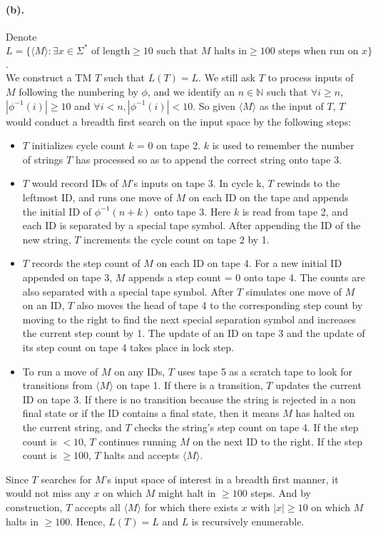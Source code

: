 \documentclass[12pt]{article}
\begin{document}
\paragraph*{(b).} Denote \(L = \{\langle M \rangle : \exists x \in \Sigma^* \text{ of length} \geq 10 \text{ such that } M \text{ halts in} \geq 100 \text{ steps when run on } x\}\).\\
We construct a TM \(T\) such that \(L(T) = L\). We still ask \(T\) to process inputs of \(M\) following the numbering by \(\phi\), and we identify an \(n \in \mathbb{N}\) such that \(\forall i \geq n\), \( |\phi^{-1}(i)| \geq 10\) and \(\forall i < n, |\phi^{-1}(i)| < 10\). So given \(\langle M \rangle\) as the input of \(T\), \(T\) would conduct a breadth first search on the input space by the following steps:
\begin{itemize}
  \item \(T\) initializes cycle count \(k\) = 0 on tape 2. \(k\) is used to remember the number of strings \(T\) has processed so as to append the correct string onto tape 3.
  \item \(T\) would record IDs of \(M\)'s inputs on tape 3. In cycle k, \(T\) rewinds to the leftmost ID, and runs one move of \(M\) on each ID on the tape and appends the initial ID of \(\phi^{-1}(n+k)\) onto tape 3. Here \(k\) is read from tape 2, and each ID is separated by a special tape symbol. After appending the ID of the new string, \(T\) increments the cycle count on tape 2 by 1.
  \item \(T\) records the step count of \(M\) on each ID on tape 4. For a new initial ID appended on tape 3, \(M\) appends a step count = 0 onto tape 4. The counts are also separated with a special tape symbol. After \(T\) simulates one move of \(M\) on an ID, \(T\) also moves the head of tape 4 to the corresponding step count by moving to the right to find the next special separation symbol and increases the current step count by 1. The update of an ID on tape 3 and the update of its step count on tape 4 takes place in lock step.
  \item To run a move of \(M\) on any IDs, \(T\) uses tape 5 as a scratch tape to look for transitions from \(\langle M \rangle\) on tape 1. If there is a transition, \(T\) updates the current ID on tape 3. If there is no transition because the string is rejected in a non final state or if the ID contains a final state, then it means \(M\) has halted on the current string, and \(T\) checks the string's step count on tape 4. If the step count is \(< 10\), \(T\) continues running \(M\) on the next ID to the right. If the step count is \(\geq 100\), \(T\) halts and accepts \(\langle M \rangle\).
\end{itemize}
Since \(T\) searches for \(M\)'s input space of interest in a breadth first manner, it would not miss any \(x\) on which \(M\) might halt in \(\geq 100\) steps. And by construction, \(T\) accepts all \(\langle M \rangle\) for which there exists \(x\) with \(|x| \geq 10\) on which \(M\) halts in \(\geq 100\). Hence, \(L(T) = L\) and \(L\) is recursively enumerable.
\end{document}
